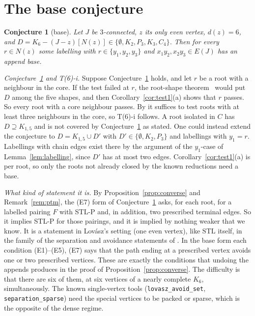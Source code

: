 \documentclass[11pt]{amsart}
\newtheorem{conjecture}[theorem]{Conjecture}
\theoremstyle{definition}
\newcommand{\STL}{\mathrm{STL}}
\begin{document}
\section{The base conjecture}\label{sec:conj}

\begin{conjecture}[base]\label{conj:base}
Let $J$ be $3$-connected, $z$ its only even vertex, $d(z)=6$, and
$D=K_6-(J-z)[N(z)]\in\{\emptyset,K_2,P_3,K_3,C_4\}$. Then for every $r\in N(z)$ some labelling with
$r\in\{y_1,y_2,y_3\}$ and $x_1y_2,x_2y_3\in E(J)$ has an append base.
\end{conjecture}

\emph{Conjecture~\ref{conj:base} and T(6)-i.} Suppose Conjecture~\ref{conj:base} holds, and
let $r$ be a root with a neighbour in the core. If the test failed at $r$, the root-shape
theorem~\cite{RS} would put $D$ among the five shapes, and then Corollary~\ref{cor:test1}(a)
shows that $r$ passes. So every root with a core neighbour passes. By \cite[Thm~144]{MR} it
suffices to test roots with at least three neighbours in the core, so T(6)-i follows. A root isolated
in $C$ has $D\supseteq K_{1,5}$ and is not covered by Conjecture~\ref{conj:base} as stated. One
could instead extend the conjecture to $D=K_{1,5}\cup D'$ with $D'\in\{\emptyset,K_2,P_3\}$ and
labellings with $y_1=r$. Labellings with chain edges exist there by the argument of the
$y_1$-case of Lemma~\ref{lem:labelling}, since $D'$ has at most two edges.
Corollary~\ref{cor:test1}(a) is per root, so only the roots not already closed by the known
reductions need a base.

\emph{What kind of statement it is.} By Proposition~\ref{prop:converse} and
Remark~\ref{rem:ptm}, the (E7) form of Conjecture~\ref{conj:base} asks, for each root, for a
labelled pairing $F$ with STL-P and, in addition, two prescribed terminal edges. So it implies
STL-P for those pairings, and it is implied by nothing weaker that we know. It is a statement in
Lov\'asz's setting (one even vertex), like $\STL$ itself, in the family of the separation and
avoidance statements of \cite{MS,L1S}. In the base form each condition (E1)--(E5), (E7) says that
the path ending at a prescribed vertex avoids one or two prescribed vertices. These are exactly
the conditions that undoing the appends produces in the proof of
Proposition~\ref{prop:converse}. The difficulty is that there are six of them, at six vertices of
a nearly complete $K_6$, simultaneously. The known single-vertex tools
(\texttt{lovasz\_avoid\_set}, \texttt{separation\_sparse}) need the special vertices to be packed
or sparse, which is the opposite of the dense regime.
\end{document}
